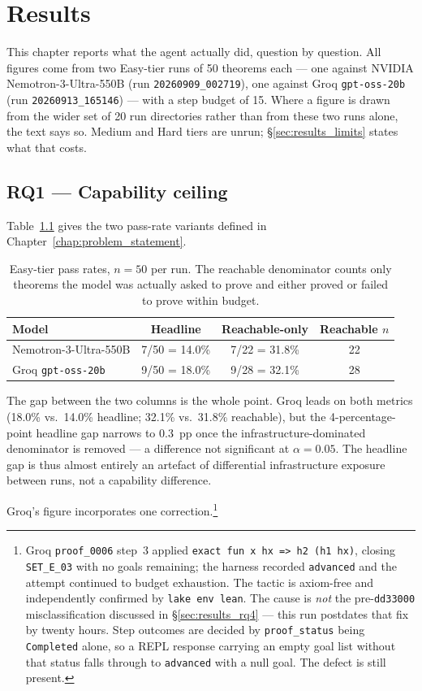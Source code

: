 \chapter{Results}
\label{chap:results}

This chapter reports what the agent actually did, question by question.
All figures come from two Easy-tier runs of 50 theorems each --- one against
NVIDIA Nemotron-3-Ultra-550B (run \texttt{20260909\_002719}), one against Groq
\texttt{gpt-oss-20b} (run \texttt{20260913\_165146}) --- with a step budget of 15.
Where a figure is drawn from the wider set of 20 run directories rather than from
these two runs alone, the text says so.
Medium and Hard tiers are unrun; \S\ref{sec:results_limits} states what that costs.

\section{RQ1 --- Capability ceiling}
\label{sec:results_rq1}

Table~\ref{tab:pass_rates} gives the two pass-rate variants defined in
Chapter~\ref{chap:problem_statement}.

\begin{table}[htbp]
\centering
\caption{Easy-tier pass rates, $n=50$ per run. The reachable denominator counts
only theorems the model was actually asked to prove and either proved or failed
to prove within budget.}
\label{tab:pass_rates}
\begin{tabular}{@{}lccc@{}}
\hline
\textbf{Model} & \textbf{Headline} & \textbf{Reachable-only} & \textbf{Reachable $n$} \\
\hline
Nemotron-3-Ultra-550B      & 7/50 = 14.0\% & 7/22 = 31.8\% & 22 \\
Groq \texttt{gpt-oss-20b}  & 9/50 = 18.0\% & 9/28 = 32.1\% & 28 \\
\hline
\end{tabular}
\end{table}

The gap between the two columns is the whole point.
Groq leads on both metrics (18.0\% vs.\ 14.0\% headline; 32.1\% vs.\ 31.8\%
reachable), but the 4-percentage-point headline gap narrows to 0.3~pp once the
infrastructure-dominated denominator is removed --- a difference not significant
at $\alpha = 0.05$. The headline gap is thus almost entirely an artefact of
differential infrastructure exposure between runs, not a capability difference.

Groq's figure incorporates one correction.\footnote{Groq \texttt{proof\_0006}
step~3 applied \texttt{exact fun x hx => h2 (h1 hx)}, closing
\texttt{SET\_E\_03} with no goals remaining; the harness recorded
\texttt{advanced} and the attempt continued to budget exhaustion. The tactic is
axiom-free and independently confirmed by \texttt{lake env lean}. The cause is
\emph{not} the pre-\texttt{dd33000} misclassification discussed in
\S\ref{sec:results_rq4} --- this run postdates that fix by twenty hours. Step
outcomes are decided by \texttt{proof\_status} being \texttt{Completed} alone,
so a REPL
response carrying an empty goal list without that status falls through to
\texttt{advanced} with a null goal. The defect is still present.}

